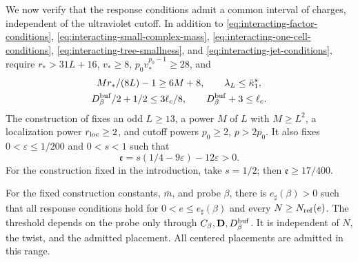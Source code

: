 We now verify that the response conditions admit
a common interval of charges, independent of the
ultraviolet cutoff. In addition to
\eqref{eq:interacting-factor-conditions},
\eqref{eq:interacting-small-complex-mass},
\eqref{eq:interacting-one-cell-conditions},
\eqref{eq:interacting-tree-smallness}, and
\eqref{eq:interacting-jet-conditions}, require
$r_*>31L+16$, $v_*\ge8$, $p_0v_*^{p_0-1}\ge28$, and
\begin{gather}
 Mr_*/(8L)-1\ge6M+8,\qquad
 \lambda_L\le\bar\kappa_1^s,
                                  \label{eq:interacting-last-response-conditions}\\
 D_\beta^{\rm buf}/2+1/2\le3\ell_c/8,\qquad
 D_\beta^{\rm buf}+3\le\ell_c .
                                  \label{eq:interacting-placement-conditions}
\end{gather}
The construction of \cite[\S6.1]{CoverTuning}
fixes an odd $L\ge13$, a power
$M$ of $L$ with $M\ge L^2$, a localization
power $r_{\rm loc}\ge2$, and cutoff powers
$p_0\ge2$, $p>2p_0$. It also fixes
$0<\varepsilon\le1/200$ and $0<s<1$ such that
\begin{equation}\label{eq:interacting-response-exponents}
 \mathfrak e=s(1/4-9\varepsilon)-12\varepsilon>0.
\end{equation}
For the construction fixed in the introduction, take $s=1/2$;
then $\mathfrak e\ge17/400$.

\begin{proposition}\label{prop:interacting-positive-threshold}
For the fixed construction constants, $\bar m$,
and probe $\beta$, there is $e_\sharp(\beta)>0$
such that all response conditions hold for
$0<e\le e_\sharp(\beta)$ and every
$N\ge N_{\rm ref}(e)$. The threshold depends
on the probe only through
$C_\beta,\mathbf D,D_\beta^{\rm buf}$.
It is independent of $N$, the twist, and the
admitted placement. All centered placements
are admitted in this range.
\end{proposition}

